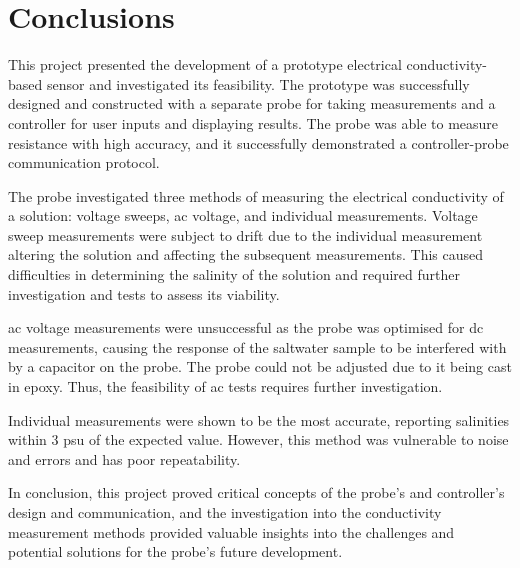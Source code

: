 \chapter{Conclusions}\label{ch:conclusions}

This project presented the development of a prototype electrical conductivity-based sensor and investigated its feasibility.
The prototype was successfully designed and constructed with a separate probe for taking measurements and a controller for user inputs and displaying results.
The probe was able to measure resistance with high accuracy, and it successfully demonstrated a controller-probe communication protocol.

The probe investigated three methods of measuring the electrical conductivity of a solution: voltage sweeps, \gls{ac} voltage, and individual measurements.
Voltage sweep measurements were subject to drift due to the individual measurement altering the solution and affecting the subsequent measurements.
This caused difficulties in determining the salinity of the solution and required further investigation and tests to assess its viability.

\gls{ac} voltage measurements were unsuccessful as the probe was optimised for \gls{dc} measurements, causing the response of the saltwater sample to be interfered with by a capacitor on the probe.
The probe could not be adjusted due to it being cast in epoxy.
Thus, the feasibility of \gls{ac} tests requires further investigation.

Individual measurements were shown to be the most accurate, reporting salinities within $3$ \gls{psu} of the expected value.        
However, this method was vulnerable to noise and errors and has poor repeatability.

In conclusion, this project proved critical concepts of the probe's and controller's design and communication, and the investigation into the conductivity measurement methods provided valuable insights into the challenges and potential solutions for the probe's future development.